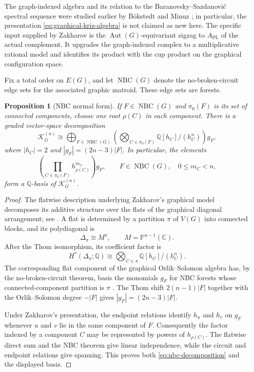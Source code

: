 \documentclass[11pt]{amsart}
\theoremstyle{plain}
\newtheorem{proposition}[theorem]{Proposition}
\theoremstyle{definition}
\theoremstyle{remark}
\newcommand{\Q}{\mathbb{Q}}
\newcommand{\C}{\mathbb{C}}
\newcommand{\PP}{\mathbb{P}}
\newcommand{\Aut}{\operatorname{Aut}}
\begin{document}
The graph-indexed algebra and its relation to the
Baranovsky--Sazdanovi\'c spectral sequence were studied earlier by
B\"okstedt and Minuz \cite{BokstedtMinuz}; in particular, the presentation
\eqref{eq:graphical-kriz-algebra} is not claimed as new here.  The specific
input supplied by Zakharov is the $\Aut(G)$-equivariant zigzag to
$A_{\mathrm{PL}}$ of the actual complement.  It upgrades the graph-indexed
complex to a multiplicative rational model and identifies its product with
the cup product on the graphical configuration space.

Fix a total order on $E(G)$, and let $\operatorname{NBC}(G)$ denote the
no-broken-circuit edge sets for the associated graphic matroid.  These edge
sets are forests.

\begin{proposition}[NBC normal form]\label{prop:nbc-normal-form}
If $F\in\operatorname{NBC}(G)$ and $\pi_0(F)$ is its set of connected
components, choose one root $\rho(C)$ in each component.  There is a graded
vector-space decomposition
\begin{equation}\label{eq:nbc-decomposition}
  \mathcal K_G^{(n)}
  \cong
  \bigoplus_{F\in\operatorname{NBC}(G)}
  \left(
    \bigotimes_{C\in\pi_0(F)}\Q[h_C]/(h_C^n)
  \right)g_F,
\end{equation}
where $|h_C|=2$ and $|g_F|=(2n-3)|F|$.  In particular, the elements
\begin{equation}\label{eq:nbc-normal-basis}
  \left(\prod_{C\in\pi_0(F)}h_{\rho(C)}^{m_C}\right)g_F,
  \qquad F\in\operatorname{NBC}(G),\quad 0\leq m_C<n,
\end{equation}
form a $\Q$-basis of $\mathcal K_G^{(n)}$.
\end{proposition}

\begin{proof}
The flatwise description underlying Zakharov's graphical model decomposes its
additive structure over the flats of the graphical diagonal arrangement; see
\cite[Section~6.2, especially Theorem~6.2.1]{Zakharov}.  A flat is determined
by a partition $\pi$ of $V(G)$ into connected blocks, and its polydiagonal is
\[
  \Delta_\pi\cong M^{\pi},
  \qquad M=\PP^{n-1}(\C).
\]
After the Thom isomorphism, its coefficient factor is
\[
  H^*(\Delta_\pi;\Q)
  \cong
  \bigotimes_{C\in\pi}\Q[h_C]/(h_C^n).
\]
The corresponding flat component of the graphical Orlik--Solomon algebra has,
by the no-broken-circuit theorem, basis the monomials $g_F$ for NBC forests
whose connected-component partition is $\pi$ \cite{OrlikSolomon}.  The Thom
shift $2(n-1)|F|$ together with the Orlik--Solomon degree $-|F|$ gives
$|g_F|=(2n-3)|F|$.

Under Zakharov's presentation, the endpoint relations identify $h_u$ and
$h_v$ on $g_F$ whenever $u$ and $v$ lie in the same component of $F$.
Consequently the factor indexed by a component $C$ may be represented by
powers of $h_{\rho(C)}$.  The flatwise direct sum and the NBC theorem give
linear independence, while the circuit and endpoint relations give spanning.
This proves both \eqref{eq:nbc-decomposition} and the displayed basis.
\end{proof}
\end{document}
